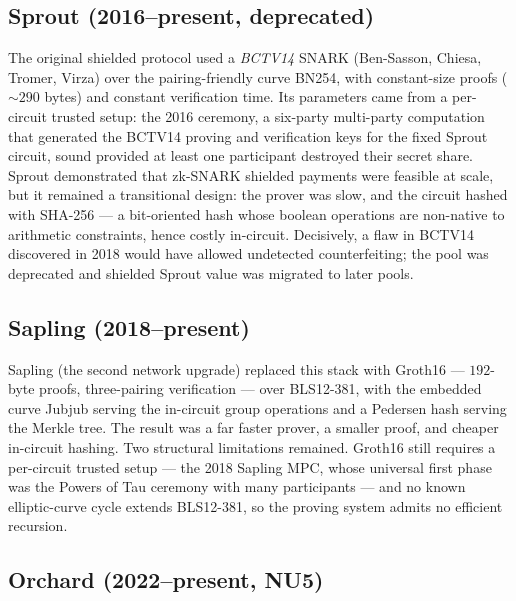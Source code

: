 \documentclass[11pt,a4paper]{article}
\theoremstyle{definition}
\begin{document}
\subsection{Sprout (2016--present, deprecated)}

The original shielded protocol used a \emph{BCTV14} SNARK (Ben-Sasson,
Chiesa, Tromer, Virza) over the pairing-friendly curve BN254, with
constant-size proofs ($\sim 290$ bytes) and constant verification time. Its
parameters came from a per-circuit trusted setup: the 2016 ceremony, a
six-party multi-party computation that generated the BCTV14 proving and
verification keys for the fixed Sprout circuit, sound provided at least one
participant destroyed their secret share. Sprout demonstrated that
zk-SNARK shielded payments were feasible at scale, but it remained a
transitional design: the prover was slow, and the circuit hashed with
SHA-256 --- a bit-oriented hash whose boolean operations are non-native to
arithmetic constraints, hence costly in-circuit. Decisively, a flaw in
BCTV14 discovered in 2018 would have allowed undetected counterfeiting; the
pool was deprecated and shielded Sprout value was migrated to later pools.

\subsection{Sapling (2018--present)}

Sapling (the second network upgrade) replaced this stack with Groth16 --- $192$-byte
proofs, three-pairing verification --- over BLS12-381, with the embedded
curve Jubjub serving the in-circuit group operations and a Pedersen hash
serving the Merkle tree. The result was a far faster prover, a smaller
proof, and cheaper in-circuit hashing. Two structural limitations remained.
Groth16 still requires a per-circuit trusted setup --- the 2018 Sapling MPC,
whose universal first phase was the Powers of Tau ceremony with many
participants --- and no known elliptic-curve cycle extends BLS12-381, so the
proving system admits no efficient recursion.

\subsection{Orchard (2022--present, NU5)}
\end{document}
